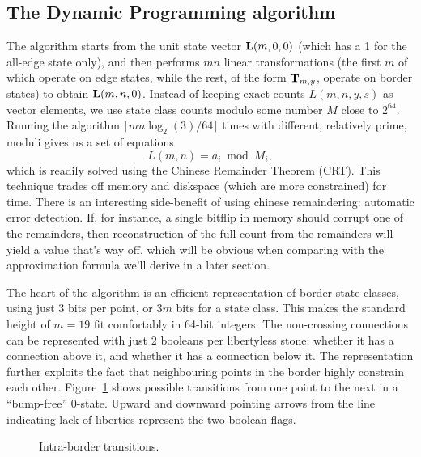 \documentclass{article}
\begin{document}
\subsection{The Dynamic Programming algorithm}
\label{DP-algorithm}

The algorithm starts from the unit state vector $\mathbf{L}(m,0,0)$
(which has a 1 for the all-edge state only),
and then performs $mn$ linear transformations
(the first $m$ of which operate on edge states, while the rest,
of the form $\mathbf{T}_{m,y}$, operate on border states)
to obtain $\mathbf{L}(m,n,0)$.
Instead of keeping exact counts $L(m,n,y,s)$ as vector elements,
we use state class counts modulo some number $M$ close to $2^{64}$.
Running the algorithm $\lceil mn \log_2(3) / 64\rceil$
times with different, relatively prime, moduli
gives us a set of equations \[L(m,n) = a_i \bmod M_i,\]
which is readily solved using the Chinese Remainder Theorem (CRT).
This technique trades off memory and diskspace (which are more constrained)
for time. There is an interesting side-benefit of using chinese remaindering:
automatic error detection. If, for instance,
a single bitflip in memory should corrupt one of the remainders,
then reconstruction of the full count from the remainders will yield
a value that's way off, which will be obvious when comparing with the
approximation formula we'll derive in a later section.

The heart of the algorithm is an efficient representation of
border state classes, using just 3 bits per point, or $3m$ bits for
a state class. This makes the standard height of $m=19$ fit
comfortably in 64-bit integers.
The non-crossing connections can be represented with just 2 booleans
per libertyless stone: whether it has a connection above it, and whether
it has a connection below it.
The representation further exploits the fact that neighbouring points
in the border highly constrain each other. Figure~\ref{borderdfa}
shows possible transitions from one point to the next in a ``bump-free''
$0$-state. Upward and downward pointing arrows from the line
indicating lack of liberties represent the two boolean flags.

\begin{figure}
\begin{center}
\epsfxsize=10cm 
\end{center}
\caption{Intra-border transitions.}
\label{borderdfa}
\end{figure}
\end{document}
